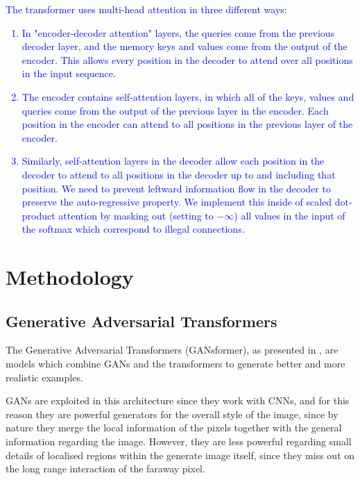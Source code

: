 \documentclass{article}
\begin{document}
	\textcolor{blue}{
	The transformer uses multi-head attention in three different ways:
	\begin{enumerate}
		\item In "encoder-decoder attention" layers, the queries come from the previous decoder layer, 
		and the memory keys and values come from the output of the encoder. This allows every position 
		in the decoder to attend over all positions in the input sequence.
		\item The encoder contains self-attention layers, in which all of the keys, values 
		and queries come from the output of the previous layer in the encoder. 
		Each position in the encoder can attend to all positions in the previous layer of the encoder.
		\item Similarly, self-attention layers in the decoder allow each position in the decoder to attend to 
		all positions in the decoder up to and including that position. We need to prevent leftward 
		information flow in the decoder to preserve the auto-regressive property. We implement this 
		inside of scaled dot-product attention by masking out (setting to $-\infty$) all values in the input 
		of the softmax which correspond to illegal connections. 
	\end{enumerate}
	}
	
	\section{Methodology}
	
	\subsection{Generative Adversarial Transformers}%
	The Generative Adversarial Transformers (GANsformer), as presented in 
	\cite{hudson2021generative}, are models which combine GANs and the transformers to generate 
	better and more realistic examples.
	
	GANs are exploited in this architecture since they work with CNNs, and for this reason they are 
	powerful generators for the overall style of the image, since by nature they merge the local 
	information of the pixels together with the general information regarding the image. 
	However, they are less powerful regarding small details of localised regions within the generate 
	image itself, since they miss out on the long range interaction of the faraway pixel.
	
\end{document}
